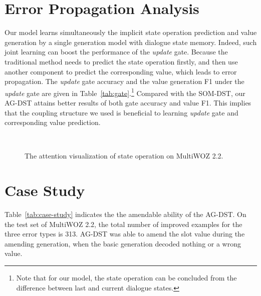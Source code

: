 \documentclass[11pt]{article}
\begin{document}



\clearpage
\appendix

\section{Error Propagation Analysis}

Our model learns simultaneously the implicit state operation prediction and value generation by a single generation model with dialogue state memory. Indeed, such joint learning can boost the performance of the \textit{update} gate. Because the traditional method needs to predict the state operation firstly, and then use another component to predict the corresponding value, which leads to error propagation. The \textit{update} gate accuracy and the value generation F1 under the \textit{update} gate are given in Table~\ref{tab:gate}.\footnote{Note that for our model, the state operation can be concluded from the difference between last and current dialogue states.} Compared with the SOM-DST, our AG-DST attains better results of both gate accuracy and value F1. This implies that the coupling structure we used is beneficial to learning \textit{update} gate and corresponding value prediction.

\begin{figure*}[bp]
	\centering
	\hspace{-0.5em}
	\\\vspace{-0.5em}
	\caption{The attention visualization of state operation on MultiWOZ 2.2.}
	\label{fig:attention_gate}
\end{figure*}

\section{Case Study}\label{appendix:case_study}

Table~\ref{tab:case-study} indicates the the amendable ability of the AG-DST. On the test set of MultiWOZ 2.2, the total number of improved examples for the three error types is 313. AG-DST was able to amend the slot value during the amending generation, when the basic generation decoded nothing or a wrong value.
\end{document}
